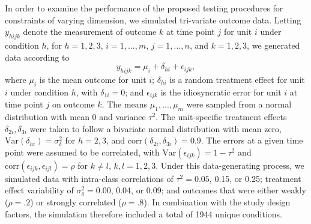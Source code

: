\documentclass[12pt]{article}\usepackage[]{graphicx}\usepackage[]{color}
\newcommand{\corr}{\text{corr}}
\newcommand{\Var}{\text{Var}}
\begin{document}
In order to examine the performance of the proposed testing procedures for constraints of varying dimension, we simulated tri-variate outcome data. 
Letting $y_{hijk}$ denote the measurement of outcome $k$ at time point $j$ for unit $i$ under condition $h$, for $h = 1,2,3$, $i = 1,...,m$, $j = 1,...,n$, and $k = 1,2,3$, we generated data according to 
\begin{equation}
\label{eq:data_generating_model}
y_{hijk} = \mu_{i} + \delta_{hi} + \epsilon_{ijk},
\end{equation}
where $\mu_i$ is the mean outcome for unit $i$; $\delta_{hi}$ is a random treatment effect for unit $i$ under condition $h$, with $\delta_{1i} = 0$; and $\epsilon_{ijk}$ is the idiosyncratic error for unit $i$ at time point $j$ on outcome $k$. 
The means $\mu_1,...,\mu_m$ were sampled from a normal distribution with mean 0 and variance $\tau^2$. 
The unit-specific treatment effects $\delta_{2i},\delta_{3i}$ were taken to follow a bivariate normal distribution with mean zero, $\Var\left(\delta_{hi}\right) = \sigma_\delta^2$ for $h = 2,3$, and $\corr\left(\delta_{2i},\delta_{3i}\right) = 0.9$.  
The errors at a given time point were assumed to be correlated, with $\Var\left(\epsilon_{ijk}\right) = 1 - \tau^2$ and $\text{corr}\left(\epsilon_{ijk}, \epsilon_{ijl}\right) = \rho$ for $k\neq l$, $k,l = 1,2,3$. 
Under this data-generating process, we simulated data with intra-class correlations of $\tau^2 = 0.05$, 0.15, or 0.25; treatment effect variability of $\sigma_\delta^2 = 0.00$, 0.04, or 0.09; and outcomes that were either weakly ($\rho = .2$) or strongly correlated ($\rho = .8$). 
In combination with the study design factors, the simulation therefore included a total of 1944 unique conditions.
\end{document}
